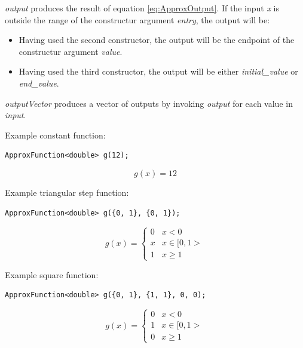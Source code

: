 \documentclass[letterpaper]{book}
\begin{document}
\textit{output} produces the result of equation \ref{eq:ApproxOutput}. If the input \textit{x} is outside the range of the constructur argument \textit{entry}, the output will be:
\begin{itemize}
\item Having used the second constructor, the output will be the endpoint of the constructur argument \textit{value}.
\item Having used the third constructor, the output will be either \textit{initial\_value} or \textit{end\_value}. 
\end{itemize}
\textit{outputVector} produces a vector of outputs by invoking \textit{output} for each value in \textit{input}. 

Example constant function:
\begin{lstlisting}
ApproxFunction<double> g(12);
\end{lstlisting}
\begin{equation}
g(x) = 12
\end{equation}

Example triangular step function:
\begin{lstlisting}
ApproxFunction<double> g({0, 1}, {0, 1});
\end{lstlisting}
\begin{equation}
g(x) = \begin{cases} 
          0 & x < 0 \\
          x & x \in [0, 1> \\
          1 & x \geq 1 
       \end{cases}
\end{equation}

Example square function:
\begin{lstlisting}
ApproxFunction<double> g({0, 1}, {1, 1}, 0, 0);
\end{lstlisting}
\begin{equation}
g(x) = \begin{cases} 
          0 & x < 0 \\
          1 & x \in [0, 1> \\
          0 & x \geq 1 
       \end{cases}
\end{equation}
\end{document}
